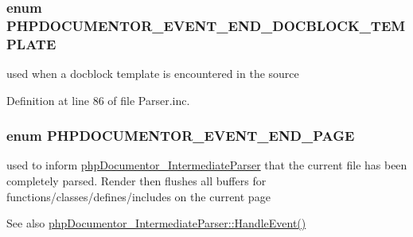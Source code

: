 \hypertarget{_parser_8inc_a8c511c405d3dbf38860f901850231062}{
\subsubsection[{\-P\-H\-P\-D\-O\-C\-U\-M\-E\-N\-T\-O\-R\-\_\-\-E\-V\-E\-N\-T\-\_\-\-E\-N\-D\-\_\-\-D\-O\-C\-B\-L\-O\-C\-K\-\_\-\-T\-E\-M\-P\-L\-A\-T\-E}]{\setlength{\rightskip}{0pt plus 5cm}enum {\bf \-P\-H\-P\-D\-O\-C\-U\-M\-E\-N\-T\-O\-R\-\_\-\-E\-V\-E\-N\-T\-\_\-\-E\-N\-D\-\_\-\-D\-O\-C\-B\-L\-O\-C\-K\-\_\-\-T\-E\-M\-P\-L\-A\-T\-E}}}\label{_parser_8inc_a8c511c405d3dbf38860f901850231062}
used when a docblock template is encountered in the source 

\-Definition at line 86 of file \-Parser.\-inc.

\hypertarget{_parser_8inc_ae801f87687a5cf37ab302d74f8de1fee}{
\subsubsection[{\-P\-H\-P\-D\-O\-C\-U\-M\-E\-N\-T\-O\-R\-\_\-\-E\-V\-E\-N\-T\-\_\-\-E\-N\-D\-\_\-\-P\-A\-G\-E}]{\setlength{\rightskip}{0pt plus 5cm}enum {\bf \-P\-H\-P\-D\-O\-C\-U\-M\-E\-N\-T\-O\-R\-\_\-\-E\-V\-E\-N\-T\-\_\-\-E\-N\-D\-\_\-\-P\-A\-G\-E}}}\label{_parser_8inc_ae801f87687a5cf37ab302d74f8de1fee}
used to inform \hyperlink{classphp_documentor___intermediate_parser}{php\-Documentor\-\_\-\-Intermediate\-Parser} that the current file has been completely parsed. \-Render then flushes all buffers for functions/classes/defines/includes on the current page \begin{DoxySeeAlso}{\-See also}
\hyperlink{classphp_documentor___intermediate_parser_a2315978686182f0bdb05425d81358b38}{php\-Documentor\-\_\-\-Intermediate\-Parser\-::\-Handle\-Event()} 
\end{DoxySeeAlso}


